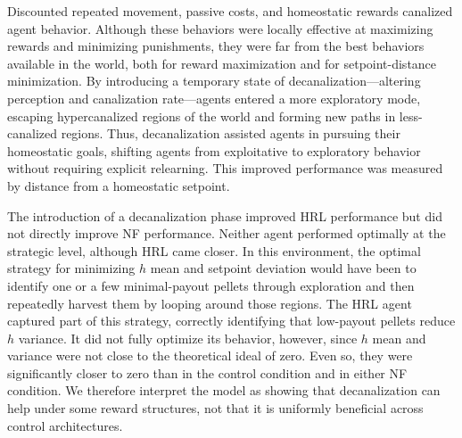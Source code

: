 \documentclass[12pt,fleqn]{article}
\begin{document}
Discounted repeated movement, passive costs, and homeostatic rewards canalized agent behavior. Although these behaviors were locally effective at maximizing rewards and minimizing punishments, they were far from the best behaviors available in the world, both for reward maximization and for setpoint-distance minimization. By introducing a temporary state of decanalization—altering perception and canalization rate—agents entered a more exploratory mode, escaping hypercanalized regions of the world and forming new paths in less-canalized regions. Thus, decanalization assisted agents in pursuing their homeostatic goals, shifting agents from exploitative to exploratory behavior without requiring explicit relearning. This improved performance was measured by distance from a homeostatic setpoint.

The introduction of a decanalization phase improved HRL performance but did not directly improve NF performance. Neither agent performed optimally at the strategic level, although HRL came closer. In this environment, the optimal strategy for minimizing \(h\) mean and setpoint deviation would have been to identify one or a few minimal-payout pellets through exploration and then repeatedly harvest them by looping around those regions. The HRL agent captured part of this strategy, correctly identifying that low-payout pellets reduce \(h\) variance. It did not fully optimize its behavior, however, since \(h\) mean and variance were not close to the theoretical ideal of zero. Even so, they were significantly closer to zero than in the control condition and in either NF condition. We therefore interpret the model as showing that decanalization can help under some reward structures, not that it is uniformly beneficial across control architectures.
\end{document}
